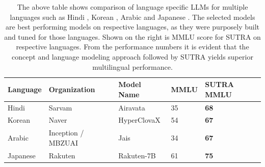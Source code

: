 \documentclass{article}
\begin{document}
\begin{table}[h]
\setlength{\abovecaptionskip}{10pt} %
\setlength{\belowcaptionskip}{5pt} %
\centering
\begin{tabular}{lllll}
\toprule
\textbf{Language} & \textbf{Organization} & \textbf{Model Name} &  \textbf{MMLU} & \textbf{SUTRA MMLU} \\ \midrule
Hindi    & Sarvam       & Airavata   & 35            & \textbf{68}         \\
Korean   & Naver        & HyperClovaX & 54           & \textbf{67}         \\
Arabic   & Inception / MBZUAI & Jais & 34            & \textbf{67}         \\
Japanese & Rakuten      & Rakuten-7B & 61            & \textbf{75}         \\ \bottomrule
\end{tabular}
\caption{The above table shows comparison of language specific LLMs for multiple languages such as Hindi \citep{gala2024airavata}, Korean \citep{son2024kmmlu}, Arabic \citep{sengupta2023jais} and Japanese \citep{group2024rakutenai}. The selected models are best performing models on respective languages, as they were purposely built and tuned for those languages. Shown on the right is MMLU score for SUTRA on respective languages. From the performance numbers it is evident that the concept and language modeling approach followed by SUTRA yields superior multilingual performance.}
\label{table:language_specific_mmlu}
\end{table}
 
\end{document}
